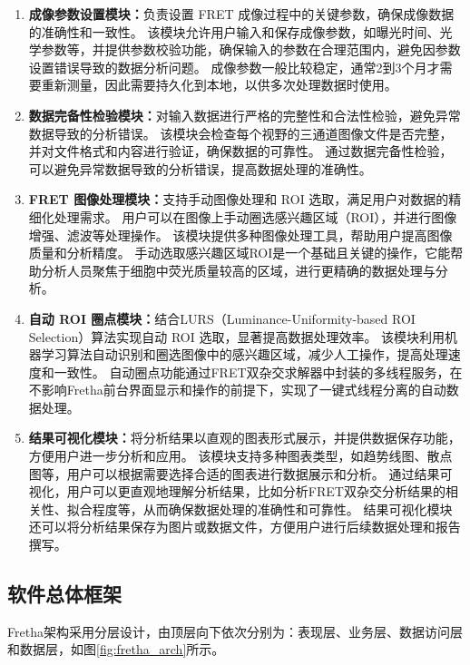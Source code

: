 \begin{enumerate}
  \item \textbf{成像参数设置模块：}负责设置 FRET 成像过程中的关键参数，确保成像数据的准确性和一致性。
  该模块允许用户输入和保存成像参数，如曝光时间、光学参数等，并提供参数校验功能，确保输入的参数在合理范围内，避免因参数设置错误导致的数据分析问题。
  成像参数一般比较稳定，通常2到3个月才需要重新测量，因此需要持久化到本地，以供多次处理数据时使用。
  \item \textbf{数据完备性检验模块：}对输入数据进行严格的完整性和合法性检验，避免异常数据导致的分析错误。
  该模块会检查每个视野的三通道图像文件是否完整，并对文件格式和内容进行验证，确保数据的可靠性。
  通过数据完备性检验，可以避免异常数据导致的分析错误，提高数据处理的准确性。
  \item \textbf{FRET 图像处理模块：}支持手动图像处理和 ROI 选取，满足用户对数据的精细化处理需求。
  用户可以在图像上手动圈选感兴趣区域（ROI），并进行图像增强、滤波等处理操作。
  该模块提供多种图像处理工具，帮助用户提高图像质量和分析精度。
  手动选取感兴趣区域ROI是一个基础且关键的操作，它能帮助分析人员聚焦于细胞中荧光质量较高的区域，进行更精确的数据处理与分析。
  \item \textbf{自动 ROI 圈点模块：}结合LURS（Luminance-Uniformity-based ROI Selection）算法实现自动 ROI 选取，显著提高数据处理效率。
  该模块利用机器学习算法自动识别和圈选图像中的感兴趣区域，减少人工操作，提高处理速度和一致性。
  自动圈点功能通过FRET双杂交求解器中封装的多线程服务，在不影响Fretha前台界面显示和操作的前提下，实现了一键式线程分离的自动数据处理。
  \item \textbf{结果可视化模块：}将分析结果以直观的图表形式展示，并提供数据保存功能，方便用户进一步分析和应用。
  该模块支持多种图表类型，如趋势线图、散点图等，用户可以根据需要选择合适的图表进行数据展示和分析。
  通过结果可视化，用户可以更直观地理解分析结果，比如分析FRET双杂交分析结果的相关性、拟合程度等，从而确保数据处理的准确性和可靠性。
  结果可视化模块还可以将分析结果保存为图片或数据文件，方便用户进行后续数据处理和报告撰写。
  
\end{enumerate}

\subsection{软件总体框架}

Fretha架构采用分层设计，由顶层向下依次分别为：表现层、业务层、数据访问层和数据层，如图\ref{fig:fretha_arch}所示。

